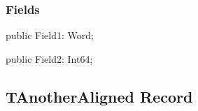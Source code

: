 \documentclass{report}
\newif\ifpdf
\begin{document}
\subsubsection*{\large{\textbf{Fields}}\normalsize\hspace{1ex}\hfill}
\begin{list}{}{
\setlength{\itemindent}{0cm}
\setlength{\listparindent}{0cm}
\setlength{\leftmargin}{\evensidemargin}
\addtolength{\leftmargin}{\tmplength}
\settowidth{\labelsep}{X}
\addtolength{\leftmargin}{\labelsep}
\setlength{\labelwidth}{\tmplength}
}
\label{ok_record_align.TAlignedRecord-Field1}
\item[\textbf{Field1}\hfill]
\ifpdf
\begin{flushleft}
\fi
\begin{ttfamily}
public Field1: Word;\end{ttfamily}

\ifpdf
\end{flushleft}
\fi


\par  \label{ok_record_align.TAlignedRecord-Field2}
\item[\textbf{Field2}\hfill]
\ifpdf
\begin{flushleft}
\fi
\begin{ttfamily}
public Field2: Int64;\end{ttfamily}

\ifpdf
\end{flushleft}
\fi


\par  \end{list}
\ifpdf
\subsection*{\large{\textbf{TAnotherAligned Record}}\normalsize\hspace{1ex}\hrulefill}
\else
\subsection*{TAnotherAligned Record}
\fi
\label{ok_record_align.TAnotherAligned}
\end{document}

